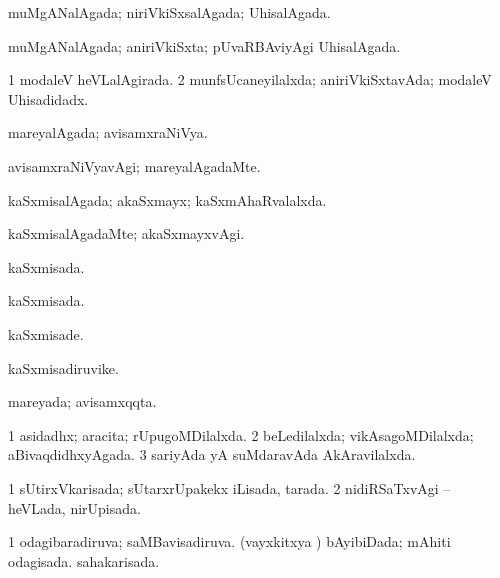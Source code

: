 \bentry
{} 
\gl{\gu}
\expl{}
\bmng
 muMgANalAgada; niriVkiSxsalAgada; UhisalAgada. 
\emng
\eentry

\bentry
{} 
\gl{\gu}
\expl{}
\bmng
 muMgANalAgada; aniriVkiSxta; pUvaRBAviyAgi UhisalAgada. 
\emng
\eentry

\bentry
{} 
\gl{\gu}
\expl{}
\bmng
\bnum
\num{1} modaleV heVLalAgirada. 
\num{2} munfsUcaneyilalxda; aniriVkiSxtavAda; modaleV Uhisadidadx. 
\enum
\emng
\eentry

\bentry
{} 
\gl{\gu}
\expl{}
\bmng
 mareyalAgada; avisamxraNiVya. 
\emng
\eentry

\bentry
{} 
\gl{\kirxvi}
\expl{}
\bmng
 avisamxraNiVyavAgi; mareyalAgadaMte. 
\emng
\eentry

\bentry
{} 
\gl{\gu}
\expl{}
\bmng
 kaSxmisalAgada; akaSxmayx; kaSxmAhaRvalalxda. 
\emng
\eentry

\bentry
{} 
\gl{\kirxvi} 
\bmng
kaSxmisalAgadaMte; akaSxmayxvAgi. 
\emng
\eentry

\bentry
{} 
\gl{\gu} 
\bmng
 kaSxmisada. 
\emng
\eentry

\bentry
{} 
\gl{\gu} 
\bmng
kaSxmisada. 
\emng
\eentry

\bentry
{} 
\gl{\kirxvi} 
\bmng
kaSxmisade. 
\emng
\eentry

\bentry
{} 
\gl{\nA} 
\bmng
 kaSxmisadiruvike. 
\emng
\eentry

\bentry
{} 
\gl{\gu}
\expl{}
\bmng
mareyada; avisamxqqta. 
\emng
\eentry

\bentry
{} 
\gl{\gu}
\expl{}
\bmng
\bnum
\num{1} asidadhx; aracita; rUpugoMDilalxda. 
\num{2} beLedilalxda; vikAsagoMDilalxda; aBivaqdidhxyAgada. 
\num{3} sariyAda yA suMdaravAda AkAravilalxda. 
\enum
\emng
\eentry

\bentry
{} 
\gl{\gu}
\expl{}
\bmng
\bnum
\num{1} sUtirxVkarisada; sUtarxrUpakekx iLisada, tarada. 
\num{2} nidiRSaTxvAgi -- heVLada, nirUpisada. 
\enum
\emng
\eentry

\bentry
{} 
\gl{\gu}
\expl{}
\bmng
\bnum
\num{1} odagibaradiruva; saMBavisadiruva. 
 (vayxkitxya \vi) 
\banum
{} bAyibiDada; mAhiti odagisada. 
 sahakarisada. 
\eanum
\numie
\enum
\emng
\eentry


